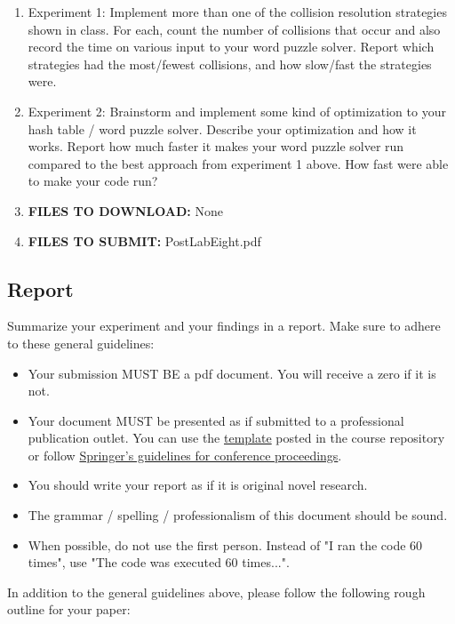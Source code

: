 \documentclass[paper=a4, fontsize=11pt, parskip=full]{scrartcl} %
\numberwithin{equation}{section} %
\numberwithin{figure}{section} %
\numberwithin{table}{section} %
\begin{document}
\begin{enumerate}
	\item Experiment 1: Implement more than one of the collision resolution strategies shown in class. For each, count the number of collisions that occur and also record the time on various input to your word puzzle solver. Report which strategies had the most/fewest collisions, and how slow/fast the strategies were.
	\item Experiment 2: Brainstorm and implement some kind of optimization to your hash table / word puzzle solver. Describe your optimization and how it works. Report how much faster it makes your word puzzle solver run compared to the best approach from experiment 1 above. How fast were able to make your code run?
	\item \textbf{FILES TO DOWNLOAD:} None
	\item \textbf{FILES TO SUBMIT:} PostLabEight.pdf
\end{enumerate}

\subsection{Report}

Summarize your experiment and your findings in a report. Make sure to adhere to these general guidelines:

\begin{itemize}
	\item Your submission MUST BE a pdf document. You will receive a zero if it is not.
	\item Your document MUST be presented as if submitted to a professional publication outlet. You can use the \href{https://markfloryan.github.io/dsa1/labs/WordPaperTemplate.zip}{template} posted in the course repository or follow \href{https://www.springer.com/us/computer-science/lncs/conference-proceedings-guidelines}{Springer's guidelines for conference proceedings}.
	\item You should write your report as if it is original novel research.
	\item The grammar / spelling / professionalism of this document should be sound.
	\item When possible, do not use the first person. Instead of "I ran the code 60 times", use "The code was executed 60 times...".
\end{itemize}

In addition to the general guidelines above, please follow the following rough outline for your paper:
\end{document}
